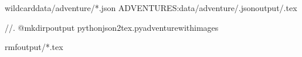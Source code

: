 \documentclass[letterpaper,10pt,english]{sphinxmanual}
\begin{document}
\begin{sphinxVerbatim}[commandchars=\\\{\}]
wildcarddata/adventure/*.json
ADVENTURES:data/adventure/\PYGZpc{}.jsonoutput/\PYGZpc{}.tex


//\PYGZpc{}.
@mkdir\PYGZhy{}poutput
pythonjson2tex.py\PYGZhy{}\PYGZhy{}adventure\PYGZhy{}\PYGZhy{}with\PYGZhy{}images\PYGZdl{}\PYGZlt{}\PYGZgt{}

rm\PYGZhy{}foutput/*.tex
\end{sphinxVerbatim}

\sphinxAtStartPar
{}
\end{document}

